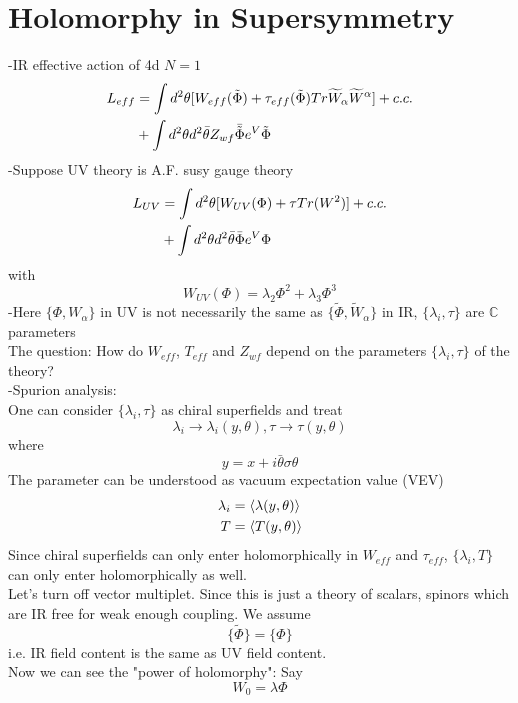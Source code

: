 \documentclass[type = bachelor]{fduthesis-en}
\begin{document}
\section{Holomorphy in Supersymmetry}
-IR effective action of 4d $N=1$
\begin{align}
\notag
L_{eff}&=\int d^2\theta [W_{eff}(\tilde{\Phi})+\tau_{eff}(\tilde{\Phi})Tr\widetilde{W}_\alpha\widetilde{W}^\alpha]+c.c.\\
&+\int d^2\theta d^2\bar{\theta}Z_{wf}\bar{\tilde{\Phi}}e^V\tilde{\Phi}
\end{align}
-Suppose UV theory is A.F. susy gauge theory
\begin{align}
\notag
L_{UV}&=\int d^2\theta [W_{UV}(\Phi)+\tau Tr(W^2)]+c.c.\\
&+\int d^2\theta d^2\bar{\theta}\bar{\Phi}e^V\Phi
\end{align}
with
\begin{equation}
W_{UV}(\Phi)=\lambda_2\Phi^2+\lambda_3\Phi^3
\end{equation}
-Here $\{\Phi,W_\alpha\}$ in UV is not necessarily the same as $\{\tilde{\Phi},\tilde{W}_\alpha\}$ in IR, $\{\lambda_i,\tau\}$ are $\mathbb{C}$ parameters\\
The question: How do $W_{eff}$, $T_{eff}$ and $Z_{wf}$ depend on the parameters $\{\lambda_i,\tau\}$ of the theory?\\
-Spurion analysis:
\\One can consider $\{\lambda_i,\tau\}$ as chiral superfields and treat
$$\lambda_i\rightarrow\lambda_i(y,\theta), \tau \rightarrow \tau(y, \theta)$$
where
$$y=x+i\bar{\theta}\sigma\theta$$ 
The parameter can be understood as vacuum expectation value (VEV)
\begin{align}
\notag
\lambda_i&=\langle\lambda(y,\theta)\rangle
\\T&=\langle T(y,\theta)\rangle
\end{align}
Since chiral superfields can only enter holomorphically in $W_{eff}$ and $\tau_{eff}$, $\{\lambda_i,T\}$ can only enter holomorphically as well.\\
Let's turn off vector multiplet. Since this is just a theory of scalars, spinors which are IR free for weak enough coupling. We assume
\begin{equation}
\{\tilde{\Phi}\}=\{\Phi\}
\end{equation}
i.e. IR field content is the same as UV field content.\\
Now we can see the "power of holomorphy": Say
\begin{equation}
W_0=\lambda \Phi
\end{equation}
\end{document}
